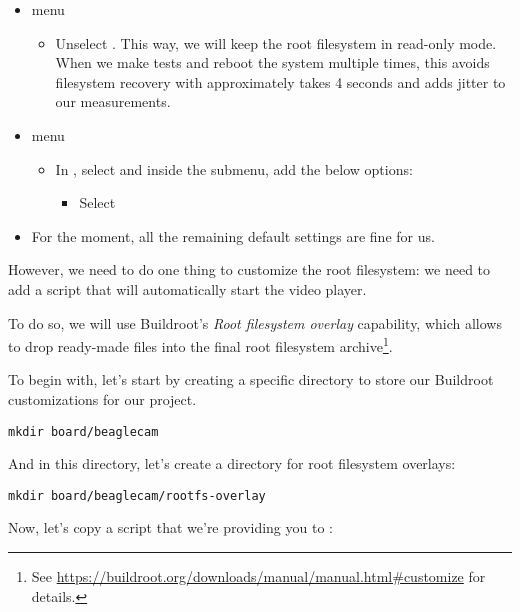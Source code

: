 \begin{itemize}
\item {} menu
  \begin{itemize}
  \item Unselect .
    This way, we will keep the root filesystem in read-only mode. When
    we make tests and reboot the system multiple times, this avoids
    filesystem recovery with approximately takes 4 seconds and adds
    jitter to our measurements.
  \end{itemize}

\item {} menu
  \begin{itemize}
  \item In , select  and
  inside the  submenu, add the below options:
     \begin{itemize}
     \item Select 
     \end{itemize}
  \end{itemize}

\item For the moment, all the remaining default settings are fine for us.
\end{itemize}

However, we need to do one thing to customize the root filesystem: we
need to add a script that will automatically start the 
video player.

To do so, we will use Buildroot's {\em Root filesystem overlay}
capability, which allows to drop ready-made files into the final root
filesystem archive\footnote{See
\url{https://buildroot.org/downloads/manual/manual.html\#customize} for
details.}.

To begin with, let's start by creating a specific directory to store our
Buildroot customizations for our project.

\begin{verbatim}
mkdir board/beaglecam
\end{verbatim}

And in this directory, let's create a directory for root filesystem
overlays:

\begin{verbatim}
mkdir board/beaglecam/rootfs-overlay
\end{verbatim}

Now, let's copy a script that we're providing you to :

